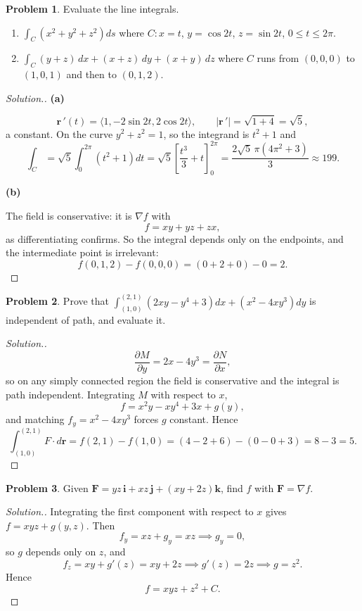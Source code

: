 \documentclass[11pt,a4paper]{article}
\theoremstyle{definition}
\newtheorem{problemx}{Problem}[subsection]
\newenvironment{problem}{\begin{problemx}}{\end{problemx}}
\newenvironment{solution}
  {\renewcommand{\qedsymbol}{}\begin{proof}[\textit{Solution}.]}
  {\end{proof}}
\newcommand{\subhead}[1]{%
  \par\medskip\noindent\textbf{#1}\par\nobreak\smallskip}
\begin{document}
\begin{problem}
Evaluate the line integrals.
\begin{enumerate}
\item[(a)] $\displaystyle{\int_C(x^2+y^2+z^2)ds}$ where
$C: x=t$, $y=\cos 2t$, $z=\sin 2t$, $0\leq t\leq 2\pi$.
\item[(b)] $\displaystyle{\int_C(y+z)\,dx+(x+z)\,dy+(x+y)\,dz}$ where $C$ runs
from $(0,0,0)$ to $(1,0,1)$ and then to $(0,1,2)$.
\end{enumerate}
\end{problem}
\begin{solution}
\subhead{(a)}
\[\mathbf r\,'(t) = \langle 1, -2\sin 2t, 2\cos 2t\rangle,\qquad
\left|\mathbf r\,'\right| = \sqrt{1+4} = \sqrt5 ,\]
a constant. On the curve $y^2+z^2 = 1$, so the integrand is $t^2+1$ and
\[\int_C = \sqrt5\int_0^{2\pi}(t^2+1)dt
= \sqrt5\left[\frac{t^3}{3}+t\right]_0^{2\pi}
= \frac{2\sqrt5\,\pi(4\pi^2+3)}{3}\approx 199 .\]

\subhead{(b)}
The field is conservative: it is $\nabla f$ with
\[f = xy+yz+zx ,\]
as differentiating confirms. So the integral depends only on the endpoints,
and the intermediate point is irrelevant:
\[f(0,1,2) - f(0,0,0) = (0+2+0) - 0 = 2 .\]
\end{solution}

\begin{problem}
Prove that
$\displaystyle{\int_{(1,0)}^{(2,1)}(2xy-y^4+3)dx
+ (x^2-4xy^3)dy}$ is independent of path, and evaluate it.
\end{problem}
\begin{solution}
\[\frac{\partial M}{\partial y} = 2x-4y^3 = \frac{\partial N}{\partial x},\]
so on any simply connected region the field is conservative and the integral is
path independent. Integrating $M$ with respect to $x$,
\[f = x^2y - xy^4 + 3x + g(y),\]
and matching $f_y = x^2-4xy^3$ forces $g$ constant. Hence
\[\int_{(1,0)}^{(2,1)} F\cdot d\mathbf r = f(2,1)-f(1,0)
= (4-2+6) - (0-0+3) = 8-3 = 5 .\]
\end{solution}

\begin{problem}
Given $\mathbf{F} = yz\,\mathbf{i} + xz\,\mathbf{j} + (xy+2z)\mathbf{k}$, find
$f$ with $\mathbf{F} = \nabla f$.
\end{problem}
\begin{solution}
Integrating the first component with respect to $x$ gives
$f = xyz + g(y,z)$. Then
\[f_y = xz + g_y = xz \implies g_y = 0 ,\]
so $g$ depends only on $z$, and
\[f_z = xy + g'(z) = xy+2z \implies g'(z) = 2z \implies g = z^2 .\]
Hence
\[f = xyz + z^2 + C .\]
\end{solution}
\end{document}
